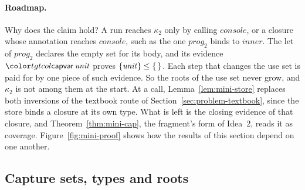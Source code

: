 \paragraph{Roadmap.}
Why does the claim hold? A run reaches $\kappa_2$ only by calling $\mathit{console}$, or a closure whose annotation reaches $\mathit{console}$, such as the one $\mathit{prog}_2$ binds to $\mathit{inner}$. The let of $\mathit{prog}_2$ declares the empty set for its body, and its evidence $\ev{capvar}\,\mathit{unit}$ proves $\{\mathit{unit}\} \le \{\,\}$. Each step that changes the use set is paid for by one piece of such evidence. So the roots of the use set never grow, and $\kappa_2$ is not among them at the start. At a call, Lemma~\ref{lem:mini-store} replaces both inversions of the textbook route of Section~\ref{sec:problem-textbook}, since the store binds a closure at its own type. What is left is the closing evidence of that closure, and Theorem~\ref{thm:mini-cap}, the fragment's form of Idea~2, reads it as coverage. Figure~\ref{fig:mini-proof} shows how the results of this section depend on one another.

\FloatBarrier
\subsection{Capture sets, types and roots}\label{sec:mini-roots}

